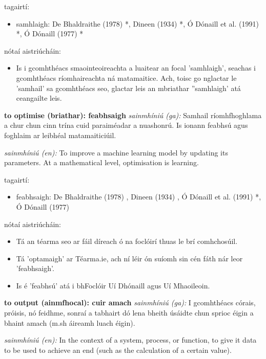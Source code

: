 \documentclass{article}
\begin{document}
tagairtí:
\begin{itemize}
	\item samhlaigh: De Bhaldraithe (1978) \cite{de-bhaldraithe}*, Dineen (1934) \cite{dineen}*, Ó Dónaill et al. (1991) \cite{focloir-beag}*, Ó Dónaill (1977) \cite{odonaill}*
\end{itemize}

nótaí aistriúcháin:
\begin{itemize}
	\item Is i gcomhthéacs smaointeoireachta a luaitear an focal 'samhlaigh', seachas i gcomhthéacs ríomhaireachta ná matamaitice. Ach, toisc go nglactar le 'samhail' sa gcomhthéacs seo, glactar leis an mbriathar ''samhlaigh' atá ceangailte leis.
\end{itemize}


\textbf{to optimise (briathar): feabhsaigh}
\textit{sainmhíniú (ga):} Samhail ríomhfhoghlama a chur chun cinn trína cuid paraiméadar a nuashonrú. Is ionann feabhsú agus foghlaim ar leibhéal matamaiticiúil.

\textit{sainmhíniú (en):} To improve a machine learning model by updating its parameters. At a mathematical level, optimisation is learning.

tagairtí:
\begin{itemize}
	\item feabhsaigh: De Bhaldraithe (1978) \cite{de-bhaldraithe}, Dineen (1934) \cite{dineen}, Ó Dónaill et al. (1991) \cite{focloir-beag}*, Ó Dónaill (1977) \cite{odonaill}
\end{itemize}

nótaí aistriúcháin:
\begin{itemize}
	\item Tá an téarma seo ar fáil díreach ó na foclóirí thuas le brí comhchosúil.
	\item Tá 'optamaigh' ar Téarma.ie, ach ní léir ón suíomh sin cén fáth nár leor 'feabhsaigh'.
	\item Is é 'feabhsú' atá i bhFoclóir Uí Dhónaill agus Uí Mhaoileoin.
\end{itemize}


\textbf{to output (ainmfhocal): cuir amach}
\textit{sainmhíniú (ga):} I gcomhthéacs córais, próisis, nó feidhme, sonraí a tabhairt dó lena bheith úsáidte chun sprioc éigin a bhaint amach (m.sh áireamh luach éigin).

\textit{sainmhíniú (en):} In the context of a system, process, or function, to give it data to be used to achieve an end (such as the calculation of a certain value).
\end{document}
